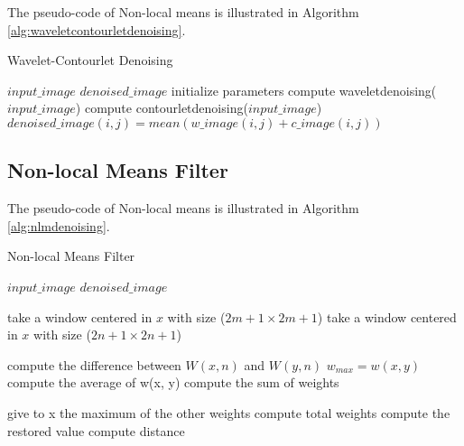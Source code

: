 The pseudo-code of Non-local means is illustrated in Algorithm \ref{alg:waveletcontourletdenoising}.

\begin{algorithm}
	\caption{Wavelet-Contourlet Denoising}\label{alg:waveletcontourletdenoising}
	\begin{algorithmic}[1]
		\Require $input\_image$
		\Ensure $denoised\_image$
		\State initialize parameters
		\State compute waveletdenoising($input\_image$) 
		\State compute contourletdenoising($input\_image$) 
		\State $denoised\_image(i,j) =  mean(w\_image(i,j)+c\_image(i,j))$
		\EndFor
		\EndProcedure
	\end{algorithmic}
\end{algorithm}


\subsection{Non-local Means Filter}

The pseudo-code of Non-local means is illustrated in Algorithm \ref{alg:nlmdenoising}.

\begin{algorithm}
	\caption{Non-local Means Filter}\label{alg:nlmdenoising}
	\begin{algorithmic}[1]
		\Require $input\_image$
		\Ensure $denoised\_image$
		
			\State take a window centered in $x$ with size ($2m+1 \times 2m+1$)
			\State take a window centered in $x$ with size ($2n+1 \times 2n+1$)

		
				\State compute the difference between $W(x,n)$ and $W( y,n)$
					\State $w_{max} = w(x, y)$
				\EndIf
				\State compute the average of w(x, y)
				\State compute the sum of weights
			\EndFor
		
			\State give to x the maximum of the other weights
			\State compute total weights
			\State compute the restored value
			\State compute distance
		\EndFor
				
		\EndProcedure
	\end{algorithmic}
\end{algorithm}

